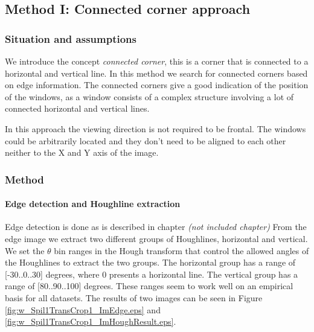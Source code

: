 





\subsection{Method I: Connected corner approach} 
\subsubsection{Situation and assumptions}
We introduce the concept \emph{connected corner}, this is a corner that is 
connected to a horizontal and vertical line.  
In this method we search for connected corners based on edge information.
The connected corners give a good indication of the position of the windows, as 
a window consists of a complex structure involving a lot of connected horizontal
and vertical lines. 

In this approach the viewing direction is not required to be frontal.
The windows could be arbitrarily located and they don't need
to be aligned to each other neither to the X and Y axis of the image.

\subsubsection{Method}
\paragraph{Edge detection and Houghline extraction}
Edge detection is done as is described in chapter 
\emph{(not included chapter)} %
From the edge image we extract two different groups of Houghlines, horizontal and 
vertical.  We set the $\theta$ bin ranges in the Hough transform that control the
allowed angles of the Houghlines to extract the two groups. The horizontal group
has a range of [-30..0..30] degrees, where 0 presents a horizontal line. The vertical
group has a range of [80..90..100] degrees. These ranges seem
to work well on an empirical basis for all datasets.
The results of two images can be seen in Figure \ref{fig:w_Spil1TransCrop1_ImEdge.eps} and
 \ref{fig:w_Spil1TransCrop1_ImHoughResult.eps}.

